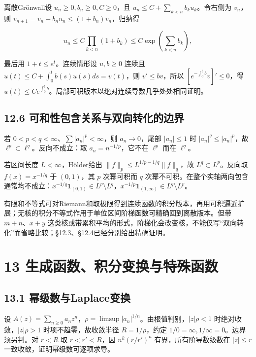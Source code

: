 \documentclass[11pt,a4paper]{article}
\begin{document}
离散Grönwall设 \(u_n\ge0,b_n\ge0,C\ge0\)，且
\(u_n\le C+\sum_{k<n}b_ku_k\)。令右侧为 \(v_n\)，则
\(v_{n+1}=v_n+b_nu_n\le(1+b_n)v_n\)，归纳得

\[
u_n\le C\prod_{k<n}(1+b_k)\le C\exp(\sum_{k<n}b_k),
\]

最后用 \(1+t\le e^t\)。连续情形设 \(u,b\ge0\) 连续且
\(u(t)\le C+\int_0^tb(s)u(s)ds=v(t)\)，则 \(v'\le bv\)，所以
\([e^{-\int_0^tb}v]'\le0\)，得
\(u(t)\le Ce^{\int_0^tb}\)。局部可积版本以绝对连续导数几乎处处相同证明。

\subsection{12.6
可和性包含关系与双向转化的边界}\label{ux53efux548cux6027ux5305ux542bux5173ux7cfbux4e0eux53ccux5411ux8f6cux5316ux7684ux8fb9ux754c}

若 \(0<p<q<\infty\)、\(\sum|a_n|^p<\infty\)，则 \(a_n\to0\)，尾部
\(|a_n|\le1\) 时 \(|a_n|^q\le|a_n|^p\)，故
\(\ell^p\subset\ell^q\)。反向不成立：取 \(a_n=n^{-1/p}\)，它不在
\(\ell^p\) 而在 \(\ell^q\)。

若区间长度 \(L<\infty\)，Hölder给出
\(\|f\|_p\le L^{1/p-1/q}\|f\|_q\)，故 \(L^q\subset L^p\)。反向取
\(f(x)=x^{-1/q}\) 于 \((0,1)\)，其 \(p\) 次幂可积而 \(q\)
次幂不可积。在整个实轴两向包含通常均不成立：\(x^{-1/q}\mathbf1_{(0,1)}\in L^p\setminus L^q\)，\(x^{-1/p}\mathbf1_{(1,\infty)}\in L^q\setminus L^p\)。

有限和不等式可对Riemann和取极限得到连续函数的积分版本，再用可积逼近扩展；无核的积分不等式作用于单位区间阶梯函数可精确回到离散版本。但带
\(m+n\)、\(x+y\)
这类核或带累积平均的形式，阶梯化会改变核，不能仅写``双向转化''而省略比较；§12.3、§12.4已经分别给出精确证明。

\clearpage

\section{13
生成函数、积分变换与特殊函数}\label{ux751fux6210ux51fdux6570ux79efux5206ux53d8ux6362ux4e0eux7279ux6b8aux51fdux6570}

\subsection{13.1
幂级数与Laplace变换}\label{ux5e42ux7ea7ux6570ux4e0elaplaceux53d8ux6362}

设
\(A(z)=\sum_{n\ge0}a_nz^n\)，\(\rho=\limsup|a_n|^{1/n}\)。由根值判别，\(|z|\rho<1\)
时绝对收敛，\(|z|\rho>1\) 时项不趋零，故收敛半径 \(R=1/\rho\)，约定
\(1/0=\infty,1/\infty=0\)。边界须另判。对 \(r<R\) 取 \(r<r'<R\)，因
\(n^k(r/r')^n\) 有界，所有阶导数级数在 \(|z|\le r\)
一致收敛，证明幂级数可逐项求导。
\end{document}
